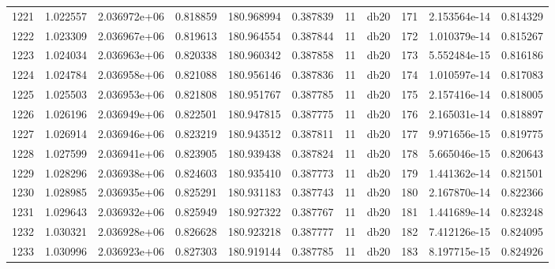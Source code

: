 \begin{tabular}{lrrrrrrlrrr}
1221 &    1.022557 &        2.036972e+06 &  0.818859 &              180.968994 &    0.387839 &      11 &         db20 &    171 &   2.153564e-14 &      0.814329 \\
1222 &    1.023309 &        2.036967e+06 &  0.819613 &              180.964554 &    0.387844 &      11 &         db20 &    172 &   1.010379e-14 &      0.815267 \\
1223 &    1.024034 &        2.036963e+06 &  0.820338 &              180.960342 &    0.387858 &      11 &         db20 &    173 &   5.552484e-15 &      0.816186 \\
1224 &    1.024784 &        2.036958e+06 &  0.821088 &              180.956146 &    0.387836 &      11 &         db20 &    174 &   1.010597e-14 &      0.817083 \\
1225 &    1.025503 &        2.036953e+06 &  0.821808 &              180.951767 &    0.387785 &      11 &         db20 &    175 &   2.157416e-14 &      0.818005 \\
1226 &    1.026196 &        2.036949e+06 &  0.822501 &              180.947815 &    0.387775 &      11 &         db20 &    176 &   2.165031e-14 &      0.818897 \\
1227 &    1.026914 &        2.036946e+06 &  0.823219 &              180.943512 &    0.387811 &      11 &         db20 &    177 &   9.971656e-15 &      0.819775 \\
1228 &    1.027599 &        2.036941e+06 &  0.823905 &              180.939438 &    0.387824 &      11 &         db20 &    178 &   5.665046e-15 &      0.820643 \\
1229 &    1.028296 &        2.036938e+06 &  0.824603 &              180.935410 &    0.387773 &      11 &         db20 &    179 &   1.441362e-14 &      0.821501 \\
1230 &    1.028985 &        2.036935e+06 &  0.825291 &              180.931183 &    0.387743 &      11 &         db20 &    180 &   2.167870e-14 &      0.822366 \\
1231 &    1.029643 &        2.036932e+06 &  0.825949 &              180.927322 &    0.387767 &      11 &         db20 &    181 &   1.441689e-14 &      0.823248 \\
1232 &    1.030321 &        2.036928e+06 &  0.826628 &              180.923218 &    0.387777 &      11 &         db20 &    182 &   7.412126e-15 &      0.824095 \\
1233 &    1.030996 &        2.036923e+06 &  0.827303 &              180.919144 &    0.387785 &      11 &         db20 &    183 &   8.197715e-15 &      0.824926 \\

\end{tabular}
